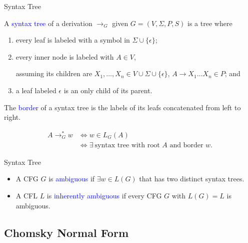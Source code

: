 \documentclass{beamer}
\def\spadding{\vspace{0.25cm}}
\def\b{\textcolor{blue}}
\begin{document}
\begin{frame}{Syntax Tree}
    \begin{definition}
        A \b{syntax tree} of a derivation $\to_G$ given $G = (V, \Sigma, P, S)$ is a tree where\pause
        \begin{enumerate}
            \item every leaf is labeled with a symbol in $\Sigma \cup \{\epsilon\}$\pause;
            \item every inner node is labeled with $A \in V$,\par
                assuming its children are $X_1, \dots, X_n \in V \cup \Sigma \cup \{\epsilon\}$, $A \to X_1 \dots X_n \in P$\pause; and
            \item a leaf labeled $\epsilon$ is an only child of its parent.
        \end{enumerate}\pause\spadding
        The \b{border} of a syntax tree is the labels of its leafs concatenated from left to right.
    \end{definition}\pause
    \begin{align*}
        A \to_G^* w &\iff w \in L_G(A) \\
                    &\iff \exists\ \text{syntax tree with root } A \text{ and border } w.
    \end{align*}
\end{frame}

\begin{frame}{Syntax Tree}
    \begin{definition}
        \begin{itemize}
            \item A CFG $G$ is \b{ambiguous} if $\exists w \in L(G)$ that has two distinct syntax trees.
            \item A CFL $L$ is \b{inherently ambiguous} if every CFG $G$ with $L(G) = L$ is ambiguous.
        \end{itemize}
    \end{definition}
\end{frame}

\subsection{Chomsky Normal Form}
\end{document}
